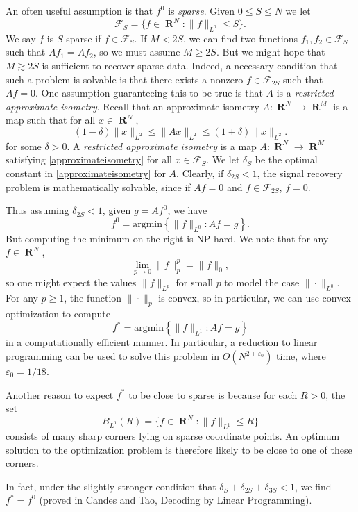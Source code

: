 \documentclass{article}
\theoremstyle{plain}
\DeclareMathOperator{\RR}{\mathbf{R}}
\begin{document}
An often useful assumption is that $f^0$ is \emph{sparse}. Given $0 \leq S \leq N$ we let
%
\[ \mathcal{F}_S = \{ f \in \RR^N : \| f \|_{L^0} \leq S \}. \]
%
We say $f$ is $S$-sparse if $f \in \mathcal{F}_S$. If $M < 2S$, we can find two functions $f_1,f_2 \in \mathcal{F}_S$ such that $Af_1 = Af_2$, so we must assume $M \geq 2S$. But we might hope that $M \gtrsim 2S$ is sufficient to recover sparse data. Indeed, a necessary condition that such a problem is solvable is that there exists a nonzero $f \in \mathcal{F}_{2S}$ such that $Af = 0$. One assumption guaranteeing this to be true is that $A$ is a \emph{restricted approximate isometry}. Recall that an approximate isometry $A: \RR^N \to \RR^M$ is a map such that for all $x \in \RR^N$,
%
\begin{equation} \label{approximateisometry}
    (1 - \delta) \| x \|_{L^2} \leq \| Ax \|_{L^2} \leq (1 + \delta) \| x \|_{L^2}.
\end{equation}
%
for some $\delta > 0$. A \emph{restricted approximate isometry} is a map $A: \RR^N \to \RR^M$ satisfying \ref{approximateisometry} for all $x \in \mathcal{F}_S$. We let $\delta_S$ be the optimal constant in \ref{approximateisometry} for $A$. Clearly, if $\delta_{2S} < 1$, the signal recovery problem is mathematically solvable, since if $Af = 0$ and $f \in \mathcal{F}_{2S}$, $f = 0$.

Thus assuming $\delta_{2S} < 1$, given $g = Af^0$, we have
%
\[ f^0 = \text{argmin} \left\{ \| f \|_{L^0} : Af = g \right\}. \]
%
But computing the minimum on the right is NP hard. We note that for any $f \in \RR^N$,
%
\[ \lim_{p \to 0} \| f \|_p^p = \| f \|_0, \]
%
so one might expect the values $\| f \|_{L^p}$ for small $p$ to model the case $\| \cdot \|_{L^0}$. For any $p \geq 1$, the function $\| \cdot \|_p$ is convex, so in particular, we can use convex optimization to compute
%
\[ f^* = \text{argmin} \left\{ \| f \|_{L^1} : Af = g \right\} \]
%
in a computationally efficient manner. In particular, a reduction to linear programming can be used to solve this problem in $O(N^{2+\varepsilon_0})$ time, where $\varepsilon_0 = 1/18$.

Another reason to expect $f^*$ to be close to sparse is because for each $R > 0$, the set
%
\[ B_{L^1}(R) = \{ f \in \RR^N: \| f \|_{L^1} \leq R \} \]
%
consists of many sharp corners lying on sparse coordinate points. An optimum solution to the optimization problem is therefore likely to be close to one of these corners.

In fact, under the slightly stronger condition that $\delta_S + \delta_{2S} + \delta_{3S} < 1$, we find $f^* = f^0$ (proved in Candes and Tao, Decoding by Linear Programming).
\end{document}
